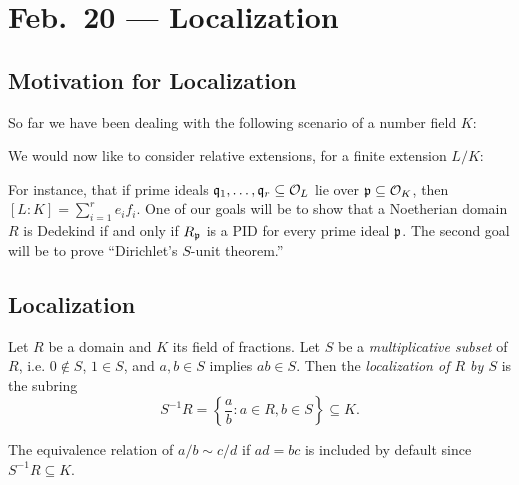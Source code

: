 \chapter{Feb.~20 --- Localization}

\section{Motivation for Localization}

\begin{remark}
So far we have been dealing with the following
scenario of a number field $K$:
\begin{center}
\end{center}
We would now like to consider relative extensions,
for a finite extension $L / K$:
\begin{center}
\end{center}
For instance, that if prime ideals $\mathfrak{q}_1, \dots, \mathfrak{q}_r \subseteq \mathcal{O}_L$ lie
over $\mathfrak{p} \subseteq \mathcal{O}_K$, then $[L : K] = \sum_{i = 1}^r e_i f_i$.
One of our goals will be to show that a Noetherian
domain $R$ is Dedekind if and only if $R_{\mathfrak{p}}$ is a
PID for every prime ideal $\mathfrak{p}$.
The second goal will be to prove
``Dirichlet's $S$-unit theorem.''
\end{remark}

\section{Localization}

\begin{definition}
  Let $R$ be a domain and $K$ its field of fractions.
  Let $S$ be a \emph{multiplicative subset} of $R$,
  i.e. $0 \notin S$, $1 \in S$, and
  $a, b \in S$ implies $ab \in S$. Then the
  \emph{localization of $R$ by $S$} is the subring
  \[
    S^{-1} R = \left\{ \frac{a}{b} : a \in R, b \in S \right\} \subseteq K.
  \]
\end{definition}

\begin{remark}
  The equivalence relation of $a / b \sim c / d$
  if $ad = bc$ is included by default since
  $S^{-1} R \subseteq K$.
\end{remark}

